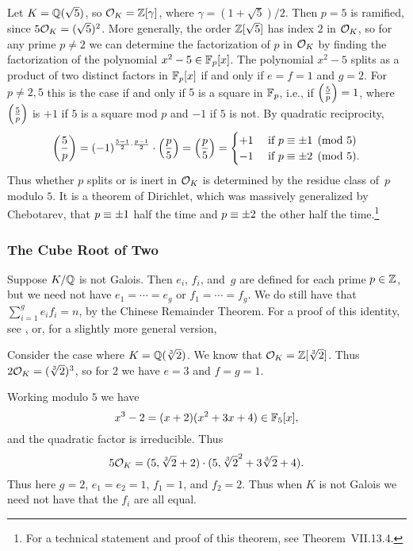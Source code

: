 \begin{example}\label{exam:decompQsqrt5}
Let $K=\mathbb{Q}(\sqrt{5})$, so $\mathcal{O}_K=\mathbb{Z}[\gamma]$, where
$\gamma=(1+\sqrt{5})/2$.  Then $p=5$ is ramified, since $5\mathcal{O}_K =
(\sqrt{5})^2$.  More generally, the order $\mathbb{Z}[\sqrt{5}]$ has index $2$
in $\mathcal{O}_K$, so for any prime $p\neq 2$ we can determine the
factorization of $p$ in $\mathcal{O}_K$ by finding the factorization of the
polynomial $x^2-5\in \mathbb{F}_p[x]$.  The polynomial $x^2-5$ splits as a
product of two distinct factors in $\mathbb{F}_p[x]$ if and only if $e=f=1$
and $g=2$.  For $p\neq 2,5$ this is the case if and only if $5$ is a
square in $\mathbb{F}_p$, i.e., if $\left(\frac{5}{p}\right) = 1$, where $\left(\frac{5}{p}\right)$ is $+1$
if $5$ is a square mod $p$ and $-1$ if $5$ is not.  By quadratic
reciprocity,
$$
 \left(\frac{5}{p}\right) = (-1)^{\frac{5-1}{2}\cdot \frac{p-1}{2}} \cdot \left(\frac{p}{5}\right) =
   \left(\frac{p}{5}\right) = \begin{cases} +1 & \text{ if } p\equiv \pm 1\pmod{5}\\ -1&\text{ if } p \equiv \pm 2\pmod{5}.\end{cases}
$$
Thus whether $p$ splits or is inert in
$\mathcal{O}_K$ is determined by the residue class of~$p$
modulo $5$.  It is a theorem of Dirichlet, which was massively
generalized by Chebotarev, that $p\equiv \pm 1$ half the time
and $p \equiv \pm 2$ the other half the time.\footnote{
For a technical statement and proof of this theorem,
see \cite{neukirch1999} Theorem~VII.13.4.}
\end{example}

\subsubsection*{The Cube Root of Two}

Suppose $K/\mathbb{Q}$ is not Galois.
Then $e_i$, $f_i$, and~$g$ are defined for each prime $p\in\mathbb{Z}$,
but we need not have $e_1=\cdots=e_g$ or $f_1=\cdots =f_g$.  We do still have that
$\sum_{i=1}^g e_i f_i = n$, by the Chinese Remainder Theorem.
For a proof of this identity, see \cite[Thm.~21]{marcus1977number},
or, for a slightly more general version, \cite[Prop.~I.8.2]{neukirch1999}

Consider the case where $K=\mathbb{Q}(\sqrt[3]{2})$. We know that $\mathcal{O}_K = \mathbb{Z}[\sqrt[3]{2}]$.  Thus
$2\mathcal{O}_K = (\sqrt[3]{2})^3$, so for $2$ we have $e=3$ and $f=g=1$.

Working modulo $5$ we have
$$
 x^3 - 2 = (x+2)(x^2+3x+4) \in \mathbb{F}_5[x],
$$
and the quadratic factor is irreducible.  Thus
$$
 5\mathcal{O}_K = (5, \sqrt[3]{2}+2)\cdot (5, \sqrt[3]{2}^2 + 3\sqrt[3]{2} + 4).
$$
Thus here $g=2$, $e_1=e_2=1$, $f_1=1$, and $f_2=2$.
Thus when $K$ is not Galois we need not have that the $f_i$
are all equal.

